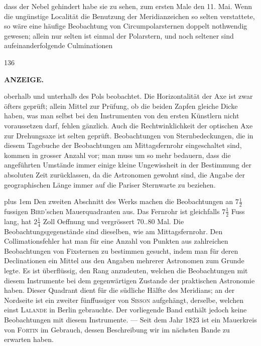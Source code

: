 dass der Nebel gehindert habe sie zu sehen, zum ersten Male den 11. Mai. Wenn die ungünstige Localität die Benutzung der Meridianzeichen so selten verstattete, so wäre eine häufige Beobachtung von Circumpolarsternen doppelt nothwendig gewesen; allein nur selten ist einmal der Polarstern, und noch seltener sind aufeinanderfolgende Culminationen\par
{}\hfill{\small 136}\hspace*{.18\linewidth}\par
\clearpage
\thispagestyle{empty}
\noindent{}%
%
\parbox[t]{\dimexpr\linewidth-24mm\relax}{\centering\scriptsize\bfseries ANZEIGE.}%
\makebox[12mm][r]{}\par\medskip
\noindent oberhalb und unterhalb des Pols beobachtet. Die Horizontalität der Axe ist zwar öfters geprüft; allein Mittel zur Prüfung, ob die beiden Zapfen gleiche Dicke haben, was man selbst bei den Instrumenten von den ersten Künstlern nicht voraussetzen darf, fehlen gänzlich. Auch die Rechtwinklichkeit der optischen Axe zur Drehungsaxe ist selten geprüft. Beobachtungen von Sternbedeckungen, die in diesem Tagebuche der Beobachtungen am Mittagsfernrohr eingeschaltet sind, kommen in grosser Anzahl vor; man muss um so mehr bedauern, dass die angeführten Umstände immer einige kleine Ungewissheit in der Bestimmung der absoluten Zeit zurücklassen, da die Astronomen gewohnt sind, die Angabe der geographischen Länge immer auf die Pariser Sternwarte zu beziehen.

\begingroup\rightskip=0pt plus 1em Den zweiten Abschnitt des Werks machen die Beobachtungen an $7\frac{1}{2}$fussigen \textsc{Bird}'schen Mauerquadranten aus. Das Fernrohr ist gleichfalls $7\frac{1}{2}$ Fuss lang, hat $2\frac{1}{4}$ Zoll Oeffnung und vergrössert 70..80 Mal. Die Beobachtungsgegenstände sind dieselben, wie am Mittagsfernrohr. Den Collimationsfehler hat man für eine Anzahl von Punkten aus zahlreichen Beobachtungen von Fixsternen zu bestimmen gesucht, indem man für deren Declinationen ein Mittel aus den Angaben mehrerer Astronomen zum Grunde legte. Es ist überflüssig, den Rang anzudeuten, welchen die Beobachtungen mit diesem Instrumente bei dem gegenwärtigen Zustande der praktischen Astronomie haben. Dieser Quadrant dient für die südliche Hälfte des Meridians; an der Nordseite ist ein zweiter fünffussiger von \textsc{Sisson} aufgehängt, derselbe, welchen einst \textsc{Lalande} in Berlin gebrauchte. Der vorliegende Band enthält jedoch keine Beobachtungen mit diesem Instrumente. --- Seit dem Jahr 1823 ist ein Mauerkreis von \textsc{Fortin} im Gebrauch, dessen Beschreibung wir im nächsten Bande zu erwarten haben.\par\endgroup

